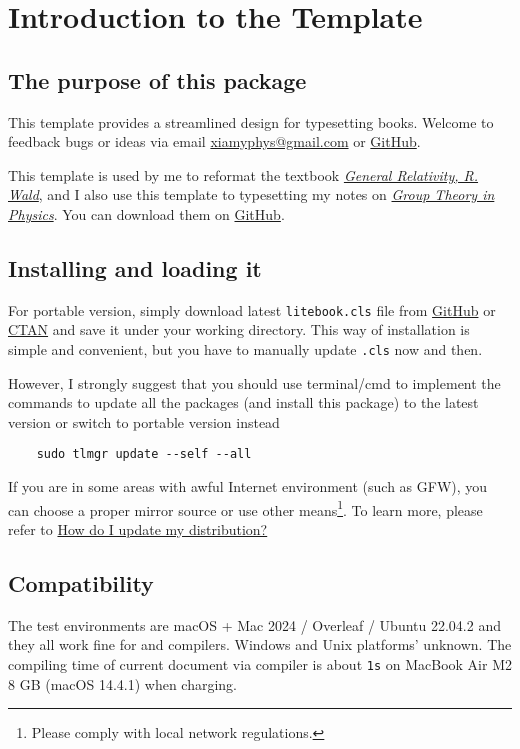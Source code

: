 \chapter{Introduction to the Template}

\section{The purpose of this package}
This template provides a streamlined design for typesetting books. Welcome to feedback bugs or ideas via email \href{mailto:xiamyphys@gmail.com}{\ttfamily xiamyphys@gmail.com} or \href{https://github.com/xiamyphys/litebook}{GitHub}.

This template is used by me to reformat the textbook \href{https://github.com/xiamyphys/LaTeX-General-Relativity-R.Wald}{\emph{General Relativity, R. Wald}}, and I also use this template to typesetting my notes on \href{https://github.com/xiamyphys/Group-Theory-in-Physics}{\emph{Group Theory in Physics}}. You can download them on \href{https://github.com/xiamyphys}{GitHub}.

\section{Installing  and loading it}
For portable version, simply download latest \verb|litebook.cls| file from \href{https://github.com/xiamyphys/LiteBook}{GitHub} or \href{https://ctan.org/pkg/litebook}{CTAN} and save it under your working directory. This way of installation is simple and convenient, but you have to manually update \verb|.cls| now and then.

However, I strongly suggest that you should use terminal/cmd to implement the commands to update all the packages (and install this package) to the latest version or switch to portable version instead
\begin{verbatim}
    sudo tlmgr update --self --all
\end{verbatim}

If you are in some areas with awful Internet environment (such as GFW), you can choose a proper mirror source or use other means\footnote{Please comply with local network regulations.}. To learn more, please refer to \href{https://tex.stackexchange.com/questions/55437/how-do-i-update-my-tex-distribution}{How do I update my  distribution?}

\section{Compatibility}
The test environments are macOS + Mac 2024 / Overleaf / Ubuntu 22.04.2 and they all work fine for  and  compilers. Windows and Unix platforms' unknown. The compiling time of current document via  compiler is about \verb|1s| on \textsf{MacBook Air M2 8 GB (macOS 14.4.1)} when charging.


